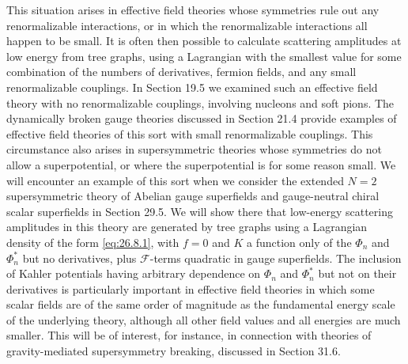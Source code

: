This situation arises in effective field theories whose symmetries rule out
any renormalizable interactions, or in which the renormalizable interactions
all happen to be small. It is often then possible to calculate scattering
amplitudes at low energy from tree graphs, using a Lagrangian with the smallest
value for some combination of the numbers of derivatives, fermion fields, and
any small renormalizable couplings. In Section 19.5 we examined such an
effective field theory with no renormalizable couplings, involving nucleons and
soft pions. The dynamically broken gauge theories discussed in Section 21.4
provide examples of effective field theories of this sort with small
renormalizable couplings. This circumstance also arises in supersymmetric
theories whose symmetries do not allow a superpotential, or where the
superpotential is for some reason small. We will encounter an example of this
sort when we consider the extended \(N=2\) supersymmetric theory of Abelian
gauge superfields and gauge-neutral chiral scalar superfields in Section 29.5.
We will show there that low-energy scattering amplitudes in this theory are
generated by tree graphs using a Lagrangian density of the form
\eqref{eq:26.8.1}, with \(f=0\) and \(K\) a function only of the \(\Phi_n\)
and \(\Phi_n^*\) but no derivatives, plus \(\mathcal{F}\)-terms quadratic in
gauge superfields. The inclusion of Kahler potentials having arbitrary
dependence on \(\Phi_n\) and \(\Phi_n^*\) but not on their derivatives is
particularly important in effective field theories in which some scalar
fields are of the same order of magnitude as the fundamental energy scale of
the underlying theory, although all other field values and all energies are
much smaller. This will be of interest, for instance, in connection with
theories of gravity-mediated supersymmetry breaking, discussed in Section
31.6.

